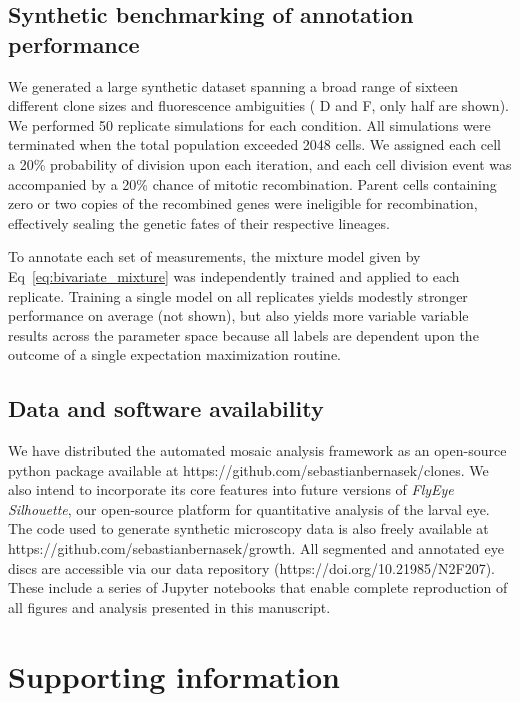 \documentclass[10pt,letterpaper]{article}
\begin{document}
\subsection*{Synthetic benchmarking of annotation performance}

We generated a large synthetic dataset spanning a broad range of sixteen different clone sizes and fluorescence ambiguities ( D and  F, only half are shown). We performed 50 replicate simulations for each condition. All simulations were terminated when the total population exceeded 2048 cells. We assigned each cell a 20\% probability of division upon each iteration, and each cell division event was accompanied by a 20\% chance of mitotic recombination. Parent cells containing zero or two copies of the recombined genes were ineligible for recombination, effectively sealing the genetic fates of their respective lineages. 

To annotate each set of measurements, the mixture model given by Eq~\ref{eq:bivariate_mixture} was independently trained and applied to each replicate. Training a single model on all replicates yields modestly stronger performance on average (not shown), but also yields more variable variable results across the parameter space because all labels are dependent upon the outcome of a single expectation maximization routine. 


\subsection*{Data and software availability}

We have distributed the automated mosaic analysis framework as an open-source python package available at https://github.com/sebastianbernasek/clones. We also intend to incorporate its core features into future versions of \textit{FlyEye Silhouette}, our open-source platform for quantitative analysis of the larval eye. The code used to generate synthetic microscopy data is also freely available at https://github.com/sebastianbernasek/growth. All segmented and annotated eye discs are accessible via our data repository (https://doi.org/10.21985/N2F207). These include a series of Jupyter notebooks that enable complete reproduction of all figures and analysis presented in this manuscript.


\section*{Supporting information}
\end{document}
